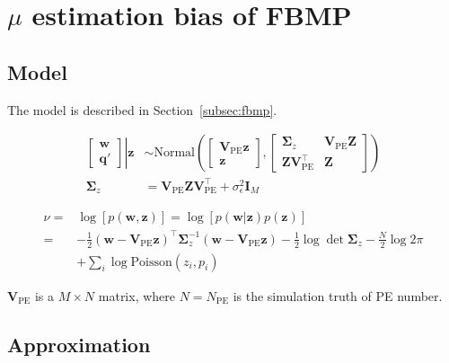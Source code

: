 \appendix
\section{$\mu$ estimation bias of FBMP}
\label{sec:mubias}

\subsection{Model}

The model is described in Section~\ref{subsec:fbmp}. 

\begin{equation}
\begin{aligned}
    \left.
    \begin{bmatrix}
        \bm{w} \\
        \bm{q}'
    \end{bmatrix}
    \right\vert\bm{z}
    &\sim \mathrm{Normal}\left(
    \begin{bmatrix}
        \bm{V}_\mathrm{PE}\bm{z} \\
        \bm{z}
    \end{bmatrix}, 
    \begin{bmatrix}
        \bm{\Sigma}_z & \bm{V}_\mathrm{PE}\bm{Z} \\
        \bm{Z}\bm{V}_\mathrm{PE}^\intercal & \bm{Z}
    \end{bmatrix}
    \right) \\
    \bm{\Sigma}_z &= \bm{V}_\mathrm{PE}\bm{Z}\bm{V}_\mathrm{PE}^\intercal+\sigma_\epsilon^2\bm{I}_M 
\end{aligned}
\end{equation}

\begin{equation}
\begin{aligned}
    \nu =& \log[p(\bm{w},\bm{z})] = \log[p(\bm{w}|\bm{z})p(\bm{z})] \\
    =& -\frac{1}{2}(\bm{w}-\bm{V}_\mathrm{PE}\bm{z})^\intercal\bm{\Sigma}_z^{-1}(\bm{w}-\bm{V}_\mathrm{PE}\bm{z})-\frac{1}{2}\log\det\bm{\Sigma}_z-\frac{N}{2}\log2\pi \\
    &+ \sum_{i}\log{\mathrm{Poisson}(z_i,p_i)}
\end{aligned}
\end{equation}

$\bm{V}_\mathrm{PE}$ is a $M\times N$ matrix, where $N=N_\mathrm{PE}$ is the simulation truth of PE number. 

\subsection{Approximation}

